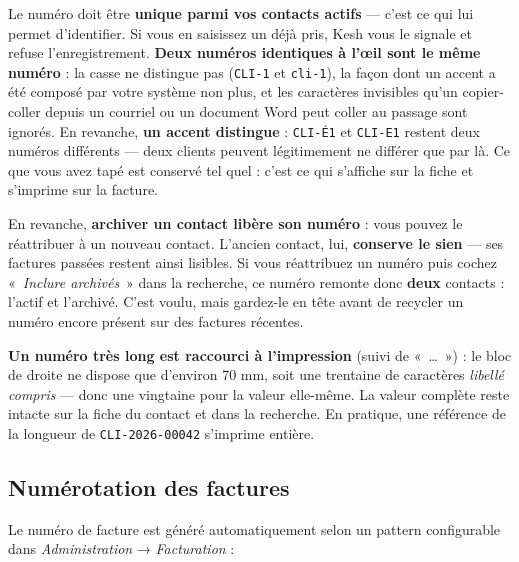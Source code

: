 \documentclass[a4paper,11pt,oneside]{article}
\begin{document}
\begin{keshnote}
Le numéro doit être \textbf{unique parmi vos contacts actifs} --- c'est ce qui lui permet d'identifier. Si vous en saisissez un déjà pris, Kesh vous le signale et refuse l'enregistrement. \textbf{Deux numéros identiques à l'œil sont le même numéro} : la casse ne distingue pas (\texttt{CLI-1} et \texttt{cli-1}), la façon dont un accent a été composé par votre système non plus, et les caractères invisibles qu'un copier-coller depuis un courriel ou un document Word peut coller au passage sont ignorés. En revanche, \textbf{un accent distingue} : \texttt{CLI-É1} et \texttt{CLI-E1} restent deux numéros différents --- deux clients peuvent légitimement ne différer que par là. Ce que vous avez tapé est conservé tel quel : c'est ce qui s'affiche sur la fiche et s'imprime sur la facture.

En revanche, \textbf{archiver un contact libère son numéro} : vous pouvez le réattribuer à un nouveau contact. L'ancien contact, lui, \textbf{conserve le sien} --- ses factures passées restent ainsi lisibles. Si vous réattribuez un numéro puis cochez «~\emph{Inclure archivés}~» dans la recherche, ce numéro remonte donc \textbf{deux} contacts : l'actif et l'archivé. C'est voulu, mais gardez-le en tête avant de recycler un numéro encore présent sur des factures récentes.
\end{keshnote}

\begin{keshwarning}
\textbf{Un numéro très long est raccourci à l'impression} (suivi de «~\ldots~») : le bloc de droite ne dispose que d'environ 70 mm, soit une trentaine de caractères \emph{libellé compris} --- donc une vingtaine pour la valeur elle-même. La valeur complète reste intacte sur la fiche du contact et dans la recherche. En pratique, une référence de la longueur de \texttt{CLI-2026-00042} s'imprime entière.
\end{keshwarning}

\subsection{Numérotation des factures}

Le numéro de facture est généré automatiquement selon un pattern configurable dans \emph{Administration} → \emph{Facturation} :
\end{document}
